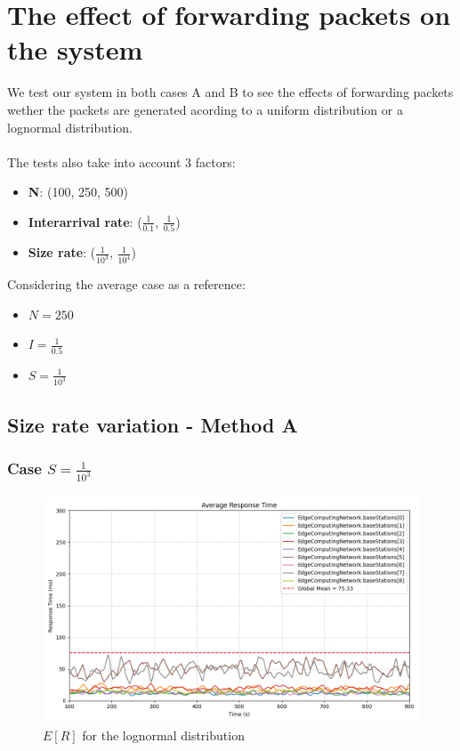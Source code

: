 \documentclass{report}
\begin{document}
\section{The effect of forwarding packets on the system}
We test our system in both cases A and B to see the effects of forwarding packets wether the packets are generated acording to a uniform distribution or a lognormal distribution.\\\\
The tests also take into account 3 factors:
\begin{itemize}
    \item \textbf{N}: (100, 250, 500)
    \item \textbf{Interarrival rate}: ($\frac{1}{0.1}$, $\frac{1}{0.5}$)
    \item \textbf{Size rate}: ($\frac{1}{10^3}$, $\frac{1}{10^4}$)
\end{itemize}

Considering the average case as a reference:
\begin{itemize}
    \item $N=250$
    \item $I=\frac{1}{0.5}$
    \item $S=\frac{1}{10^3}$
\end{itemize}

\subsection{Size rate variation - Method A}
\subsubsection*{Case $S=\frac{1}{10^3}$}

\begin{figure}[H]
    \centering
    \includegraphics[width=\textwidth]{img/plots/log_1e3_A/resptime.png}
    \caption{$E[R]$ for the lognormal distribution}
\end{figure}
\end{document}
